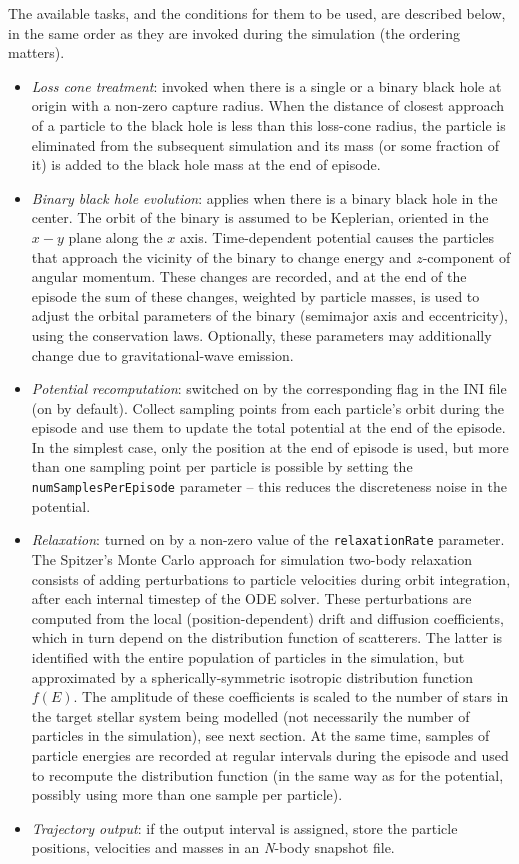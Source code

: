 \documentclass[12pt]{article}
\newcommand{\Nbody}{\textsl{N}-body\xspace}
\begin{document}
The available tasks, and the conditions for them to be used, are described below, in the same order as they are invoked during the simulation (the ordering matters).
\begin{itemize}
\item \textsl{Loss cone treatment}: invoked when there is a single or a binary black hole at origin with a non-zero capture radius. When the distance of closest approach of a particle to the black hole is less than this loss-cone radius, the particle is eliminated from the subsequent simulation and its mass (or some fraction of it) is added to the black hole mass at the end of episode. %
\item \textsl{Binary black hole evolution}: applies when there is a binary black hole in the center. The orbit of the binary is assumed to be Keplerian, oriented in the $x-y$ plane along the $x$ axis. Time-dependent potential causes the particles that approach the vicinity of the binary to change energy and $z$-component of angular momentum. These changes are recorded, and at the end of the episode the sum of these changes, weighted by particle masses, is used to adjust the orbital parameters of the binary (semimajor axis and eccentricity), using the conservation laws. Optionally, these parameters may additionally change due to gravitational-wave emission.
\item \textsl{Potential recomputation}: switched on by the corresponding flag in the INI file (on by default). Collect sampling points from each particle's orbit during the episode and use them to update the total potential at the end of the episode. In the simplest case, only the position at the end of episode is used, but more than one sampling point per particle is possible by setting the \texttt{numSamplesPerEpisode} parameter -- this reduces the discreteness noise in the potential. 
\item \textsl{Relaxation}: turned on by a non-zero value of the \texttt{relaxationRate} parameter. The Spitzer's Monte Carlo approach for simulation two-body relaxation consists of adding perturbations to particle velocities during orbit integration, after each internal timestep of the ODE solver. These perturbations are computed from the local (position-dependent) drift and diffusion coefficients, which in turn depend on the distribution function of scatterers. The latter is identified with the entire population of particles in the simulation, but approximated by a spherically-symmetric isotropic distribution function $f(E)$. The amplitude of these coefficients is scaled to the number of stars in the target stellar system being modelled (not necessarily the number of particles in the simulation), see next section. At the same time, samples of particle energies are recorded at regular intervals during the episode and used to recompute the distribution function (in the same way as for the potential, possibly using more than one sample per particle).
\item \textsl{Trajectory output}: if the output interval is assigned, store the particle positions, velocities and masses in an \Nbody snapshot file.
\end{itemize}
\end{document}
